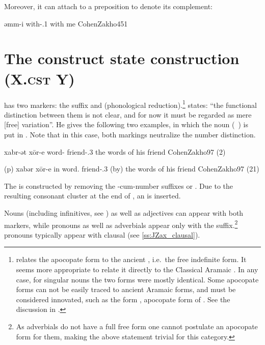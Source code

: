 Moreover, it can attach to a preposition to denote its complement:

\largerpage
{}
{əmm-i}
{with-\poss.1\sg}
{with me}
{CohenZakho}{451}\antipar\newpage

\section{The construct state construction (X.\textsc{cst} Y)} \label{ss:JZax_CST}

\JZax has two \cst* markers: the suffix  and  (phonological reduction).\footnote{\citet[92]{CohenZakho} relates the apocopate form to the ancient \abs*, i.e.\ the  free indefinite form. It seems more appropriate to relate it directly to the Classical Aramaic . In any case, for singular nouns the two forms were mostly identical. Some apocopate \cst* forms can not be easily traced to ancient Aramaic  forms, and must be considered innovated, such as the form , apocopate form of  \citep{CohenNucleus}. See the discussion in .}
\citet[97]{CohenZakho} states: \enquote{the functional distinction between them is not clear, and for now it must be regarded as mere [free] variation}. He gives  the following two examples, in which the noun  (\pl\ ) is put in \cst*. Note that in this case, both markings neutralize the number distinction.

{xabr-ət xōr-e}
{word-\cst{} friend-\poss.3\masc}
{the words of his friend}
{CohenZakho}{97 (2)}

{(p\cb{}) xabər xōr-e}
{in\cb{} word.\cst{} friend-\poss.3\masc}
{(by) the words of his friend}
{CohenZakho}{97 (21)}

The  is constructed by removing the \free*-cum-number suffixes  or . Due to the resulting consonant cluster at the end of , an   is inserted.





\largerpage
Nouns (including infinitives, see ) as well as adjectives can appear with both \cst* markers, while pronouns as well as adverbials appear only with the \ed suffix.\footnote{As adverbials do not have a full free form one cannot postulate an apocopate form for them, making the above statement trivial for this category.} \Prim pronouns typically appear with clausal \secns (see \ref{ss:JZax_clausal}).



